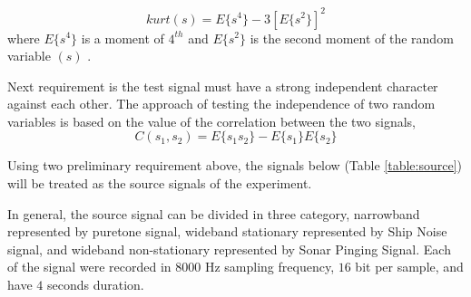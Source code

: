 \documentclass[a4paper]{jpconf}
\begin{document}
\begin{equation} \label{pers:kurt}
kurt(s) = E\{s^4\} - 3[E\{s^2\}]^2
\end{equation}
where $E\{s^4\}$ is a moment of $4^{th}$ and $E\{s^2\}$ is the second moment of the random variable $(s)$ \cite{3}.

Next requirement is the test signal must have a strong independent character against each other. The approach of testing the independence of two random variables is based on the value of the correlation between the two signals,
\begin{equation} \label{pers:corr}
C(s_1,s_2) = E\{s_1 s_2\} - E\{s_1\}E\{s_2\}
\end{equation}

Using two preliminary requirement above, the signals below (Table \ref{table:source}) will be treated as the source signals of the experiment.


In general, the source signal can be divided in three category, narrowband represented by puretone signal, wideband stationary represented by Ship Noise signal, and wideband non-stationary represented by Sonar Pinging Signal. Each of the signal were recorded in $8000$ Hz sampling frequency, $16$ bit per sample, and have $4$ seconds duration.
\end{document}
